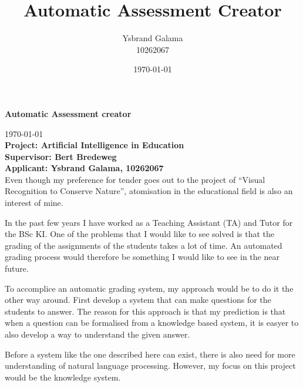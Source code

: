 \documentclass[a4paper, 12pt]{article}
\title{Automatic Assessment Creator}
\author{Ysbrand Galama \\ 10262067}
\date{\today}
\begin{document}
\thispagestyle{empty}
\begin{center}
\huge \bf Automatic Assessment creator
\end{center}
\noindent
\hfill \today\\
{\bf
Project: Artificial Intelligence in Education\\
Supervisor: Bert Bredeweg\\
Applicant: Ysbrand Galama, 10262067
}\\[10pt]

\noindent
Even though my preference for tender goes out to the project of ``Visual Recognition to Conserve Nature'', atomisation in the educational field is also an interest of mine.

In the past few years I have worked as a Teaching Assistant (TA) and Tutor for the BSc KI. One of the problems that I would like to see solved is that the grading of the assignments of the students takes a lot of time. An automated grading process would therefore be something I would like to see in the near future.

To accomplice an automatic grading system, my approach would be to do it the other way around. First develop a system that can make questions for the students to answer. The reason for this approach is that my prediction is that when a question can be formalised from a knowledge based system, it is easyer to also develop a way to understand the given answer.

Before a system like the one described here can exist, there is also need for more understanding of natural language processing. However, my focus on this project would be the knowledge system.
\end{document}
